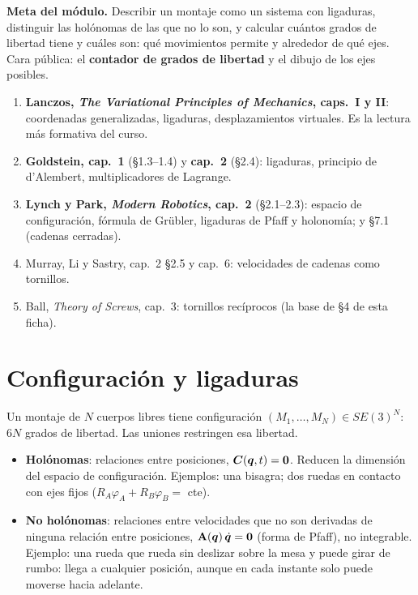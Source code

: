 \documentclass[11pt,a4paper]{article}
\begin{document}
\maketitle
\vspace{-2.5em}

\begin{meta}
\textbf{\textcolor{amarillo}{Meta del módulo.}} Describir un montaje como un sistema con ligaduras, distinguir las
holónomas de las que no lo son, y calcular cuántos grados de libertad tiene y cuáles son: qué movimientos permite y
alrededor de qué ejes. Cara pública: el \textbf{contador de grados de libertad} y el dibujo de los ejes posibles.
\end{meta}

\begin{lectura}
\begin{enumerate}[leftmargin=*]
  \item \textbf{Lanczos, \emph{The Variational Principles of Mechanics}, caps.~I y II}: coordenadas generalizadas,
        ligaduras, desplazamientos virtuales. Es la lectura más formativa del curso.
  \item \textbf{Goldstein, cap.~1} (§1.3--1.4) y \textbf{cap.~2} (§2.4): ligaduras, principio de d'Alembert,
        multiplicadores de Lagrange.
  \item \textbf{Lynch y Park, \emph{Modern Robotics}, cap.~2} (§2.1--2.3): espacio de configuración, fórmula de
        Grübler, ligaduras de Pfaff y holonomía; y §7.1 (cadenas cerradas).
  \item Murray, Li y Sastry, cap.~2 §2.5 y cap.~6: velocidades de cadenas como tornillos.
  \item Ball, \emph{Theory of Screws}, cap.~3: tornillos recíprocos (la base de §4 de esta ficha).
\end{enumerate}
\end{lectura}

\section{Configuración y ligaduras}

Un montaje de $N$ cuerpos libres tiene configuración $(M_1,\dots,M_N)\in SE(3)^N$: $6N$ grados de libertad. Las
uniones restringen esa libertad.
\begin{itemize}[leftmargin=*]
  \item \textbf{Holónomas}: relaciones entre posiciones, $\bm{C}(\bm{q}, t) = \bm{0}$. Reducen la dimensión del
        espacio de configuración. Ejemplos: una bisagra; dos ruedas en contacto con ejes fijos
        ($R_A\varphi_A + R_B\varphi_B = $ cte).
  \item \textbf{No holónomas}: relaciones entre velocidades que no son derivadas de ninguna relación entre
        posiciones, $\mathbf A(\bm{q})\,\dot{\bm{q}} = \bm{0}$ (forma de Pfaff), no integrable. Ejemplo: una rueda
        que rueda sin deslizar sobre la mesa y puede girar de rumbo: llega a cualquier posición, aunque en cada instante
        solo puede moverse hacia adelante.
\end{itemize}
\end{document}
